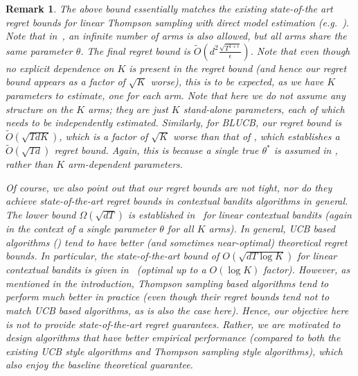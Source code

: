 \documentclass[letterpaper]{article} %
\newtheorem{remark}{Remark}
\begin{document}
\begin{remark}
The above bound essentially matches the existing state-of-the art regret bounds for linear Thompson sampling with direct model estimation (e.g.~\cite{agrawal-lints}). Note that in~\cite{agrawal-lints},
an infinite number of arms is also allowed, but all arms share the same parameter $\theta$. The final regret bound is $\tilde{O}\left(d^2 \frac{\sqrt{T^{1+\epsilon}}}{\epsilon}\right)$. Note that even though no explicit dependence on $K$ is present in the regret bound (and hence our regret bound appears as a factor of $\sqrt{K}$ worse), this is to be expected, as we have $K$ parameters to estimate, one for each arm. Note that here we do not assume any structure on the $K$ arms; they are just $K$ stand-alone parameters, each of which needs to be independently estimated. 
Similarly, for BLUCB, our regret bound is $\tilde{O}\left(\sqrt{TdK}\right)$,
which is a factor of $\sqrt{K}$ worse than that of \cite{chu2011contextual},
which establishes a $\tilde{O}\left(\sqrt{Td}\right)$ regret bound.
Again, this is because a single true $\theta^*$ is assumed in \cite{chu2011contextual}, rather than $K$ arm-dependent parameters.

Of course, we also point out that our regret bounds are not tight, nor do they achieve state-of-the-art regret bounds in contextual bandits algorithms in general.
The lower bound $\Omega({\sqrt{dT}})$ is established in~\cite{chu2011contextual} for linear contextual bandits (again in the context of a single parameter $\theta$ for all $K$ arms).
In general, UCB based algorithms (\cite{auer-linrel,chu2011contextual,bubeck2012regret,abbasi2011improved}) tend to have better
(and sometimes near-optimal) theoretical regret bounds.
In particular, the state-of-the-art bound of $O(\sqrt{dT\log K})$ for linear contextual bandits is given 
in~\cite{bubeck2012regret} (optimal up to a $O(\log K)$ factor).
However, as mentioned in the introduction, Thompson sampling based algorithms tend to perform much better in practice (even though their regret bounds tend not to match UCB based algorithms, as is also the case here). Hence, our objective here is not to provide
state-of-the-art regret guarantees. Rather, we are motivated to design algorithms that have better empirical performance (compared to both the existing UCB style algorithms and Thompson sampling style algorithms), which also enjoy the baseline theoretical guarantee.


\end{remark}
\end{document}
